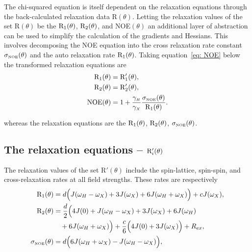 The chi-squared equation is itself dependent on the relaxation equations through the back-calculated relaxation data R$(\theta)$.  Letting the relaxation values of the set R$(\theta)$ be the $\mathrm{R}_1(\theta)$, $\mathrm{R}_2(\theta)$, and NOE$(\theta)$ an additional layer of abstraction can be used to simplify the calculation of the gradients and Hessians.  This involves decomposing the NOE equation into the cross relaxation rate constant $\sigma_{\scriptscriptstyle \mathrm{NOE}}(\theta)$ and the auto relaxation rate $\mathrm{R}_1(\theta)$.  Taking equation~\eqref{eq: NOE} below the transformed relaxation equations are
\begin{subequations}
\begin{align}
    \mathrm{R}_1(\theta) &= \mathrm{R}_1'(\theta), \\
    \mathrm{R}_2(\theta) &= \mathrm{R}_2'(\theta), \\
    \mathrm{NOE}(\theta)  &= 1 + \frac{\gamma_{\scriptscriptstyle H}}{\gamma_{\scriptscriptstyle X}} \frac{\sigma_{\scriptscriptstyle \mathrm{NOE}}(\theta)}{\mathrm{R}_1(\theta)}.
\end{align}
\end{subequations}

\noindent whereas the relaxation equations are the $\mathrm{R}_1(\theta)$, $\mathrm{R}_2(\theta)$, $\sigma_{\scriptscriptstyle \mathrm{NOE}}(\theta)$.



\subsection{The relaxation equations -- $\mathrm{R}_i'(\theta)$}

The relaxation values of the set R$'(\theta)$ include the spin-lattice, spin-spin, and cross-relaxation rates at all field strengths.  These rates are respectively \citep{Abragam61}
\begin{subequations}
\begin{align}
    \mathrm{R}_1(\theta) &= d \Big( J(\omega_H - \omega_X) + 3J(\omega_X) + 6J(\omega_H + \omega_X) \Big) + cJ(\omega_X),     \label{eq: R1} \\
    \mathrm{R}_2(\theta) &= \frac{d}{2} \Big( 4J(0) + J(\omega_H - \omega_X) + 3J(\omega_X) + 6J(\omega_H)                    \nonumber \\
        & \quad + 6J(\omega_H + \omega_X) \Big) + \frac{c}{6} \Big( 4J(0) + 3J(\omega_X) \Big) + R_{ex},              \label{eq: R2} \\  
    \sigma_{\scriptscriptstyle \mathrm{NOE}}(\theta) &= d \Big( 6J(\omega_H + \omega_X) - J(\omega_H - \omega_X) \Big),                              \label{eq: sigma_NOE}
\end{align}
\end{subequations}

